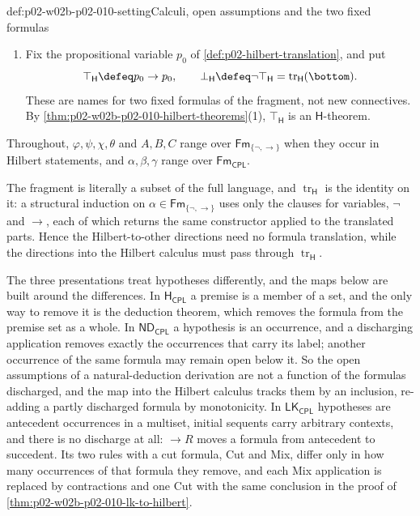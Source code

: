 \begin{hbconvention}{def:p02-w02b-p02-010-setting}{Calculi, open assumptions and the two fixed formulas}
\begin{enumerate}
    \(\land L\), \(\land R\), \(\lor L\), \(\lor R\), \(\to L\), \(\to R\);
    Cut; and Mix, which from \(\Gamma\Rightarrow\Delta,\varphi^{m}\) and
    \(\varphi^{n},\Sigma\Rightarrow\Pi\) with \(m,n\ge 1\) infers
    \(\Gamma,\Sigma\Rightarrow\Delta,\Pi\), where \(\varphi^{k}\) is \(k\)
    occurrences of \(\varphi\) and \(\Delta,\Sigma\) may contain further
    occurrences of \(\varphi\).  A finite set written
    as an antecedent is the multiset with multiplicity one on each member.
  \item Fix the propositional variable \(p_0\) of
    \cref{def:p02-hilbert-translation}, and put
    \[
      \top_{\mathsf H}\defeq p_0\to p_0,
      \qquad
      \bot_{\mathsf H}\defeq\neg\top_{\mathsf H}
      =\operatorname{tr}_{\mathsf H}(\bottom).
    \]
    These are names for two fixed formulas of the fragment, not new
    connectives.  By \cref{thm:p02-w02b-p02-010-hilbert-theorems}(1),
    \(\top_{\mathsf H}\) is an \(\mathsf H\)-theorem.
\end{enumerate}
Throughout, \(\varphi,\psi,\chi,\theta\) and \(A,B,C\) range over
\(\mathsf{Fm}_{\{\neg,\to\}}\) when they occur in Hilbert statements, and
\(\alpha,\beta,\gamma\) range over \(\mathsf{Fm}_{\mathsf{CPL}}\).
\end{hbconvention}

The fragment is literally a subset of the full language, and
\(\operatorname{tr}_{\mathsf H}\) is the identity on it: a structural
induction on \(\alpha\in\mathsf{Fm}_{\{\neg,\to\}}\) uses only the clauses for
variables, \(\neg\) and \(\to\), each of which returns the same constructor
applied to the translated parts.  Hence the Hilbert-to-other directions need
no formula translation, while the directions into the Hilbert calculus must
pass through \(\operatorname{tr}_{\mathsf H}\).

The three presentations treat hypotheses differently, and the maps below
are built around the differences.  In \(\mathsf H_{\mathsf{CPL}}\) a premise
is a member of a set, and the only way to remove it is the deduction
theorem, which removes the formula from the premise set as a whole.  In
\(\mathsf{ND}_{\mathsf{CPL}}\) a hypothesis is an occurrence, and a
discharging application removes exactly the occurrences that carry its
label; another occurrence of the same formula may remain open below it.  So
the open assumptions of a natural-deduction derivation are not a function
of the formulas discharged, and the map into the Hilbert calculus tracks
them by an inclusion, re-adding a partly discharged formula by
monotonicity.  In \(\mathsf{LK}_{\mathsf{CPL}}\) hypotheses are antecedent
occurrences in a multiset, initial sequents carry arbitrary contexts, and
there is no discharge at all: \(\to R\) moves a formula from antecedent to
succedent.  Its two rules with a cut formula, Cut and Mix, differ only in
how many occurrences of that formula they remove, and each Mix application
is replaced by contractions and one Cut with the same conclusion in the
proof of \cref{thm:p02-w02b-p02-010-lk-to-hilbert}.

